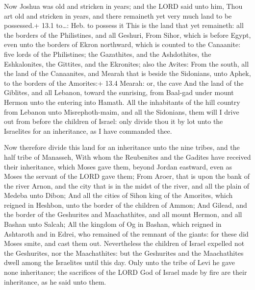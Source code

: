  Now Joshua was old and stricken in years; and the LORD said
unto him, Thou art old and stricken in years, and there remaineth yet
very much land to be possessed.+ 13.1 to\ldots: Heb. to possess it
 This is the land that yet remaineth: all the borders of the
Philistines, and all Geshuri,  From Sihor, which is before
Egypt, even unto the borders of Ekron northward, which is counted to the
Canaanite: five lords of the Philistines; the Gazathites, and the
Ashdothites, the Eshkalonites, the Gittites, and the Ekronites; also the
Avites:  From the south, all the land of the Canaanites, and
Mearah that is beside the Sidonians, unto Aphek, to the borders of the
Amorites:+ 13.4 Mearah: or, the cave  And the land of the
Giblites, and all Lebanon, toward the sunrising, from Baal-gad under
mount Hermon unto the entering into Hamath.  All the
inhabitants of the hill country from Lebanon unto Misrephoth-maim, and
all the Sidonians, them will I drive out from before the children of
Israel: only divide thou it by lot unto the Israelites for an
inheritance, as I have commanded thee.

 Now therefore divide this land for an inheritance unto the
nine tribes, and the half tribe of Manasseh,  With whom the
Reubenites and the Gadites have received their inheritance, which Moses
gave them, beyond Jordan eastward, even as Moses the servant of the LORD
gave them;  From Aroer, that is upon the bank of the river
Arnon, and the city that is in the midst of the river, and all the plain
of Medeba unto Dibon;  And all the cities of Sihon king of
the Amorites, which reigned in Heshbon, unto the border of the children
of Ammon;  And Gilead, and the border of the Geshurites and
Maachathites, and all mount Hermon, and all Bashan unto Salcah;
 All the kingdom of Og in Bashan, which reigned in
Ashtaroth and in Edrei, who remained of the remnant of the giants: for
these did Moses smite, and cast them out.  Nevertheless the
children of Israel expelled not the Geshurites, nor the Maachathites:
but the Geshurites and the Maachathites dwell among the Israelites until
this day.  Only unto the tribe of Levi he gave none
inheritance; the sacrifices of the LORD God of Israel made by fire are
their inheritance, as he said unto them.

